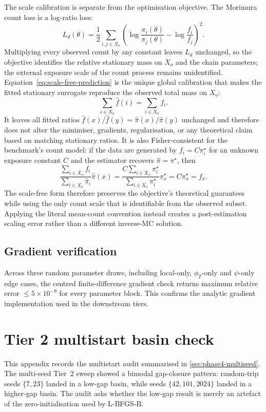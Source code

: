 The scale calibration is separate from the optimisation objective. The
Morimura count loss is a log-ratio loss:
\[
L_d(\theta)=\frac{1}{2}\sum_{i,j\in X_o}
\left(\log\frac{\pi_i(\theta)}{\pi_j(\theta)}-
\log\frac{f_i}{f_j}\right)^2 .
\]
Multiplying every observed count by any constant leaves $L_d$ unchanged,
so the objective identifies the relative stationary mass on $X_o$ and the
chain parameters; the external exposure scale of the count process remains
unidentified.
Equation~\eqref{eq:scale-free-prediction} is the unique global calibration
that makes the fitted stationary surrogate reproduce the observed total
mass on $X_o$:
\[
\sum_{i\in X_o}\hat{f}(i)=\sum_{i\in X_o}f_i .
\]
It leaves all fitted ratios
$\hat{f}(x)/\hat{f}(y)=\hat{\pi}(x)/\hat{\pi}(y)$ unchanged and therefore
does not alter the minimiser, gradients, regularisation, or any theoretical
claim based on matching stationary ratios. It is also Fisher-consistent for
the benchmark's count model: if the data are generated by
$f_i=C\pi_i^\star$ for an unknown exposure constant $C$ and the estimator
recovers $\hat{\pi}=\pi^\star$, then
\[
\frac{\sum_{i\in X_o}f_i}{\sum_{i\in X_o}\hat{\pi}_i}\hat{\pi}(x)
=
\frac{C\sum_{i\in X_o}\pi_i^\star}{\sum_{i\in X_o}\pi_i^\star}
\pi_x^\star
=C\pi_x^\star=f_x .
\]
The scale-free form therefore preserves the objective's theoretical
guarantees while using the only count scale that is identifiable from the
observed subset. Applying the literal mean-count convention instead creates
a post-estimation scaling error rather than a different inverse-MC
solution.

\subsection*{Gradient verification}

Across three random parameter draws, including local-only, $\phi_T$-only
and $\psi$-only edge cases, the centred finite-difference gradient check
returns maximum relative error $\le 5\times10^{-9}$ for every parameter
block. This confirms the analytic gradient implementation used in the
downstream tiers.

\section{Tier 2 multistart basin check}
\label{sec:phase4-multistart}

This appendix records the multistart audit summarised in
\cref{sec:phase4-multiseed}. The multi-seed Tier~2 sweep showed a bimodal
gap-closure pattern: random-trip seeds $\{7,23\}$ landed in a low-gap
basin, while seeds $\{42,101,2024\}$ landed in a higher-gap basin. The
audit asks whether the low-gap result is merely an artefact of the
zero-initialisation used by L-BFGS-B.


